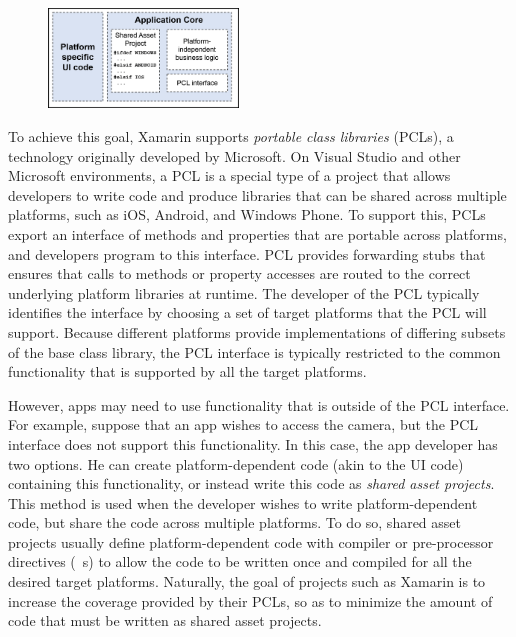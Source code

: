 \begin{figure}[t!]
\centering
\includegraphics[keepaspectratio=true,width=0.45\textwidth]{figures/appstruct.png}
{\label{figure:appstruct}}
\end{figure}

To achieve this goal, Xamarin supports \textit{portable class libraries}
(PCLs), a technology originally developed by Microsoft. On Visual Studio and
other Microsoft environments, a PCL is a special type of a project that allows
developers to write code and produce libraries that can be shared across
multiple platforms, such as iOS, Android, and Windows Phone. To support this,
PCLs export an interface of methods and properties that are portable across
platforms, and developers program to this interface. PCL provides forwarding
stubs that ensures that calls to methods or property accesses are routed to the
correct underlying platform libraries at runtime. The developer of the PCL
typically identifies the interface by choosing a set of target platforms that
the PCL will support. Because different platforms provide implementations of
differing subsets of the base  class library, the PCL interface is
typically restricted to the common  functionality that is supported
by all the target platforms. 

However, apps may need to use functionality that is outside of the PCL
interface. For example, suppose that an app wishes to access the camera, but
the PCL interface does not support this functionality. In this case, the app
developer has two options. He can create platform-dependent code (akin to the
UI code) containing this functionality, or instead write this code as
\textit{shared asset projects}. This method is used when the developer wishes to
write platform-dependent code, but share the code across multiple platforms. To
do so, shared asset projects usually define platform-dependent code with
compiler or pre-processor directives (\eg~s) to allow the code to
be written once and compiled for all the desired target platforms. Naturally,
the goal of projects such as Xamarin is to increase the coverage provided by
their PCLs, so as to minimize the amount of code that must be written as shared
asset projects.

